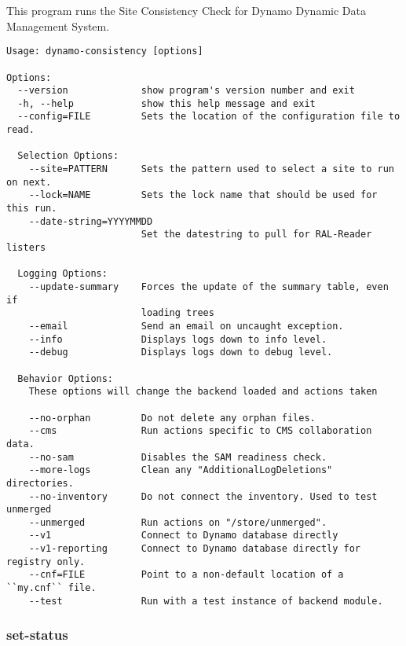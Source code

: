 This program runs the Site Consistency Check for
Dynamo Dynamic Data Management System.
{\small
\begin{verbatim}
Usage: dynamo-consistency [options]

Options:
  --version             show program's version number and exit
  -h, --help            show this help message and exit
  --config=FILE         Sets the location of the configuration file to read.

  Selection Options:
    --site=PATTERN      Sets the pattern used to select a site to run on next.
    --lock=NAME         Sets the lock name that should be used for this run.
    --date-string=YYYYMMDD
                        Set the datestring to pull for RAL-Reader listers

  Logging Options:
    --update-summary    Forces the update of the summary table, even if
                        loading trees
    --email             Send an email on uncaught exception.
    --info              Displays logs down to info level.
    --debug             Displays logs down to debug level.

  Behavior Options:
    These options will change the backend loaded and actions taken

    --no-orphan         Do not delete any orphan files.
    --cms               Run actions specific to CMS collaboration data.
    --no-sam            Disables the SAM readiness check.
    --more-logs         Clean any "AdditionalLogDeletions" directories.
    --no-inventory      Do not connect the inventory. Used to test unmerged
    --unmerged          Run actions on "/store/unmerged".
    --v1                Connect to Dynamo database directly
    --v1-reporting      Connect to Dynamo database directly for registry only.
    --cnf=FILE          Point to a non-default location of a ``my.cnf`` file.
    --test              Run with a test instance of backend module.
\end{verbatim}
}

\subsubsection{set-status}

